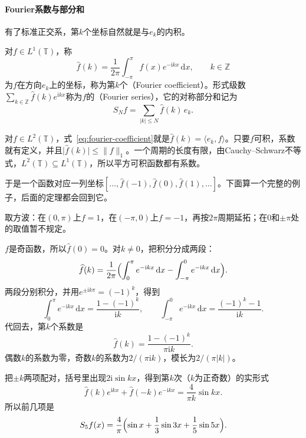 \paragraph{Fourier系数与部分和}

有了标准正交系，第$k$个坐标自然就是与$e_k$的内积。

\begin{definition}[Fourier系数与Fourier级数]
\label{def:fourier-coefficients}
对$f\in L^1(\mathbb T)$，称
\begin{equation}
\widehat f(k)=\frac1{2\pi}\int_{-\pi}^{\pi}f(x)e^{-\mathrm ikx}\,\mathrm dx ,\qquad k\in\mathbb Z
\label{eq:fourier-coefficient}
\end{equation}
为$f$在方向$e_k$上的坐标，称为第$k$个（Fourier coefficient）。形式级数$\sum_{k\in\mathbb Z}\widehat f(k)e^{\mathrm ikx}$称为$f$的（Fourier series），它的对称部分和记为
\begin{equation}
S_Nf=\sum_{\lvert k\rvert\leq N}\widehat f(k)\,e_k .
\label{eq:fourier-partial-sum}
\end{equation}
\end{definition}

对$f\in L^2(\mathbb T)$，式~\eqref{eq:fourier-coefficient}就是$\widehat f(k)=\langle e_k,f\rangle$。只要$f$可积，系数就有定义，并且$\lvert\widehat f(k)\rvert\leq\lVert f\rVert_1$。一个周期的长度有限，由Cauchy--Schwarz不等式，$L^2(\mathbb T)\subseteq L^1(\mathbb T)$，所以平方可积函数都有系数。

于是一个函数对应一列坐标$[\ldots,\widehat f(-1),\widehat f(0),\widehat f(1),\ldots]$。下面算一个完整的例子，后面的定理都会回到它。

\begin{example}[方波的坐标]
\label{ex:fourier-square-wave}
取方波：在$(0,\pi)$上$f=1$，在$(-\pi,0)$上$f=-1$，再按$2\pi$周期延拓；在$0$和$\pm\pi$处的取值暂不规定。

$f$是奇函数，所以$\widehat f(0)=0$。对$k\neq0$，把积分分成两段：
\[
\widehat f(k)=\frac1{2\pi}\Bigl(\int_0^{\pi}e^{-\mathrm ikx}\,\mathrm dx-\int_{-\pi}^0e^{-\mathrm ikx}\,\mathrm dx\Bigr).
\]
两段分别积分，并用$e^{\pm\mathrm ik\pi}=(-1)^k$，得到
\[
\int_0^{\pi}e^{-\mathrm ikx}\,\mathrm dx=\frac{1-(-1)^k}{\mathrm ik},\qquad
\int_{-\pi}^0e^{-\mathrm ikx}\,\mathrm dx=\frac{(-1)^k-1}{\mathrm ik}.
\]
代回去，第$k$个系数是
\[
\widehat f(k)=\frac{1-(-1)^k}{\pi\mathrm ik}.
\]
偶数$k$的系数为零，奇数$k$的系数为$2/(\pi\mathrm ik)$，模长为$2/(\pi\lvert k\rvert)$。

把$\pm k$两项配对，括号里出现$2\mathrm i\sin kx$，得到第$k$次（$k$为正奇数）的实形式
\[
\widehat f(k)e^{\mathrm ikx}+\widehat f(-k)e^{-\mathrm ikx}=\frac4{\pi k}\sin kx.
\]
所以前几项是
\[
S_5f(x)=\frac4\pi\Bigl(\sin x+\frac13\sin3x+\frac15\sin5x\Bigr).
\]
\end{example}

